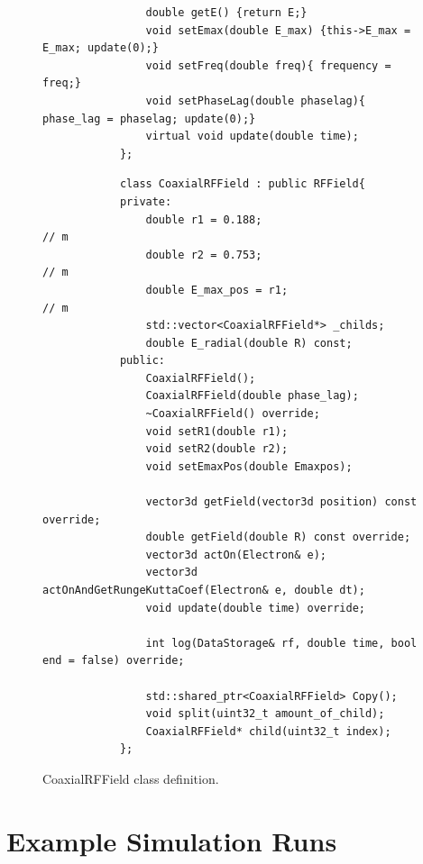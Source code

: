 \documentclass[a4paper,oneside,12pt]{report}
\numberwithin{equation}{chapter}
\begin{document}
{\begin{figure}[H]
\begin{minipage}{\textwidth}
\begin{verbatim}
                double getE() {return E;}
                void setEmax(double E_max) {this->E_max = E_max; update(0);}
                void setFreq(double freq){ frequency = freq;}
                void setPhaseLag(double phaselag){ phase_lag = phaselag; update(0);}
                virtual void update(double time);
            };
        \end{verbatim}
    \end{minipage}
    \vspace{10pt}
    \begin{minipage}{\textwidth}
        \begin{verbatim}
            class CoaxialRFField : public RFField{
            private:
                double r1 = 0.188;                         // m
                double r2 = 0.753;                         // m
                double E_max_pos = r1;                     // m
                std::vector<CoaxialRFField*> _childs;
                double E_radial(double R) const;
            public:
                CoaxialRFField();
                CoaxialRFField(double phase_lag);
                ~CoaxialRFField() override;
                void setR1(double r1);
                void setR2(double r2);
                void setEmaxPos(double Emaxpos);   

                vector3d getField(vector3d position) const override;
                double getField(double R) const override;
                vector3d actOn(Electron& e);
                vector3d actOnAndGetRungeKuttaCoef(Electron& e, double dt);    
                void update(double time) override; 

                int log(DataStorage& rf, double time, bool end = false) override;

                std::shared_ptr<CoaxialRFField> Copy();
                void split(uint32_t amount_of_child);
                CoaxialRFField* child(uint32_t index);
            };
        \end{verbatim}
    \end{minipage}
    \vspace{20pt}
    \caption{CoaxialRFField class definition.}
    \label{fig:rf_class}
\end{figure}

\chapter{Example Simulation Runs} \label{appendix:example_simulation_runs}

}
\end{document}
